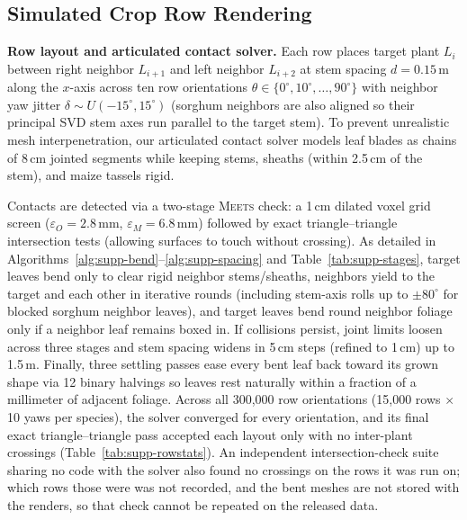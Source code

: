 \documentclass[10pt,twocolumn,letterpaper]{article}
\newcommand{\Meets}{\textsc{Meets}}
\begin{document}
\subsection{Simulated Crop Row Rendering}
\noindent\textbf{Row layout and articulated contact solver.}
Each row places target plant $L_i$ between right neighbor $L_{i+1}$ and left neighbor $L_{i+2}$ at stem spacing $d = 0.15$\,m along the $x$-axis across ten row orientations $\theta \in \{0^\circ, 10^\circ, \dots, 90^\circ\}$ with neighbor yaw jitter $\delta \sim U(-15^\circ, 15^\circ)$ (sorghum neighbors are also aligned so their principal SVD stem axes run parallel to the target stem). To prevent unrealistic mesh interpenetration, our articulated contact solver models leaf blades as chains of 8\,cm jointed segments while keeping stems, sheaths (within 2.5\,cm of the stem), and maize tassels rigid.

Contacts are detected via a two-stage \Meets{} check: a 1\,cm dilated voxel grid screen ($\varepsilon_O = 2.8$\,mm, $\varepsilon_M = 6.8$\,mm) followed by exact triangle--triangle intersection tests (allowing surfaces to touch without crossing). As detailed in Algorithms~\ref{alg:supp-bend}--\ref{alg:supp-spacing} and Table~\ref{tab:supp-stages}, target leaves bend only to clear rigid neighbor stems/sheaths, neighbors yield to the target and each other in iterative rounds (including stem-axis rolls up to $\pm 80^\circ$ for blocked sorghum neighbor leaves), and target leaves bend round neighbor foliage only if a neighbor leaf remains boxed in. If collisions persist, joint limits loosen across three stages and stem spacing widens in 5\,cm steps (refined to 1\,cm) up to 1.5\,m. Finally, three settling passes ease every bent leaf back toward its grown shape via 12 binary halvings so leaves rest naturally within a fraction of a millimeter of adjacent foliage. Across all 300{,}000 row orientations (15{,}000 rows $\times$ 10 yaws per species), the solver converged for every orientation, and its final exact triangle--triangle pass accepted each layout only with no inter-plant crossings (Table~\ref{tab:supp-rowstats}). An independent intersection-check suite sharing no code with the solver also found no crossings on the rows it was run on; which rows those were was not recorded, and the bent meshes are not stored with the renders, so that check cannot be repeated on the released data.
\end{document}
